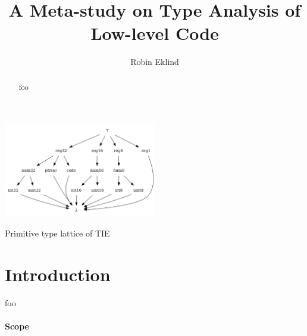 \documentclass[10pt, a4paper, sigplan]{acmart}
\title{A Meta-study on Type Analysis of Low-level Code}
\author{Robin Eklind}
\affiliation{
	\institution{Royal Institute of Technology (KTH)}
	\city{Stockholm}
	\country{Sweden}
}
\begin{document}


\begin{abstract}
foo
\end{abstract}


\begin{teaserfigure}
	\centering
	\includegraphics[width=0.5\textwidth]{inc/base_type_lattice.png}
	\caption{Primitive type lattice of TIE}
	\label{fig:base_type_lattice}
\end{teaserfigure}


\maketitle



\section{Introduction}


foo



\paragraph{Scope}
\end{document}
